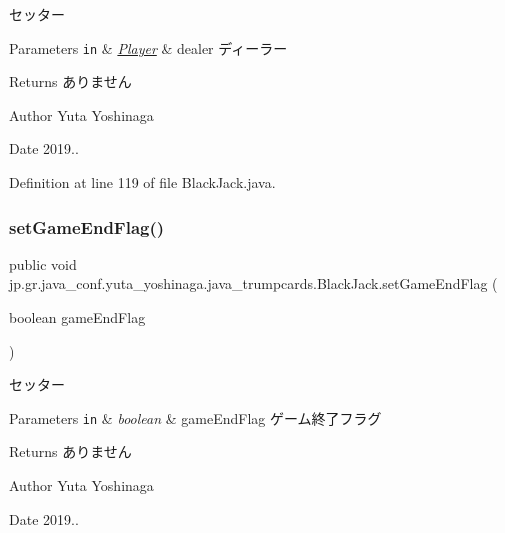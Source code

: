 セッター 


\begin{DoxyParams}[1]{Parameters}
\mbox{\tt in}  & {\em \hyperlink{classjp_1_1gr_1_1java__conf_1_1yuta__yoshinaga_1_1java__trumpcards_1_1_player}{Player}} & dealer ディーラー \\
\hline
\end{DoxyParams}
\begin{DoxyReturn}{Returns}
ありません 
\end{DoxyReturn}
\begin{DoxyAuthor}{Author}
Yuta Yoshinaga 
\end{DoxyAuthor}
\begin{DoxyDate}{Date}
2019.. 
\end{DoxyDate}


Definition at line 119 of file Black\+Jack.\+java.

\mbox{\label{classjp_1_1gr_1_1java__conf_1_1yuta__yoshinaga_1_1java__trumpcards_1_1_black_jack_a75ef56d0490e7b343fc6c02acbe43dd7}} 
\subsubsection{\texorpdfstring{set\+Game\+End\+Flag()}{setGameEndFlag()}}
{\footnotesize\ttfamily public void jp.\+gr.\+java\+\_\+conf.\+yuta\+\_\+yoshinaga.\+java\+\_\+trumpcards.\+Black\+Jack.\+set\+Game\+End\+Flag (\begin{DoxyParamCaption}\item[{boolean}]{game\+End\+Flag }\end{DoxyParamCaption})}



セッター 


\begin{DoxyParams}[1]{Parameters}
\mbox{\tt in}  & {\em boolean} & game\+End\+Flag ゲーム終了フラグ \\
\hline
\end{DoxyParams}
\begin{DoxyReturn}{Returns}
ありません 
\end{DoxyReturn}
\begin{DoxyAuthor}{Author}
Yuta Yoshinaga 
\end{DoxyAuthor}
\begin{DoxyDate}{Date}
2019.. 
\end{DoxyDate}


